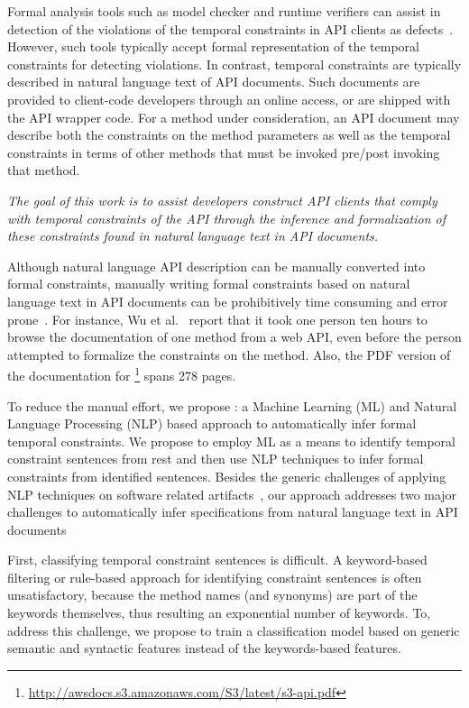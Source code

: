 Formal analysis tools such as model checker and runtime verifiers can assist in detection of the violations of the temporal constraints in API clients as defects~\cite{lee2012towards}.
However, such tools typically accept formal representation of the temporal constraints for detecting violations.
In contrast, temporal constraints are typically described in natural language text of API documents.
Such documents are provided to client-code developers through an online access, or are shipped with the API wrapper code.
For a method under consideration, an API document may describe both the constraints on the method parameters
as well as the temporal constraints in terms of other methods that must be invoked pre/post invoking that method.

\textit{The goal of this work is to assist developers construct API clients that comply with
	temporal constraints of the API through the inference and formalization of these constraints found in natural language text in API documents.}

Although natural language API description can be manually converted into formal constraints,
manually writing formal constraints based on natural language text in API documents can be prohibitively time consuming and error prone~\cite{wu2013inferring,RubingerWEB10}. 
For instance, Wu et al.~\cite{wu2013inferring} report that it took one person ten hours to browse the documentation of one method from a web API, even before the person attempted to formalize the constraints on the method. Also, the PDF version of the documentation for \amazonAPI\footnote{{\small \url{http://awsdocs.s3.amazonaws.com/S3/latest/s3-api.pdf}}} spans 278 pages.


To reduce the manual effort, we propose \tool: a Machine Learning (ML) and Natural Language Processing (NLP) based approach
to automatically infer formal temporal constraints. 
We propose to employ ML as a means to identify temporal constraint sentences from rest and then use NLP techniques to infer formal constraints from identified sentences. 
Besides the generic challenges of applying NLP techniques on software related artifacts~\cite{pandita12:inferring},
our approach addresses two major challenges to automatically infer specifications from natural language text in API documents 

First, classifying temporal constraint sentences is difficult. A keyword-based filtering or rule-based approach for identifying constraint sentences is often unsatisfactory, because the method names (and synonyms) are part of the keywords themselves, thus resulting an exponential number of keywords. To, address this challenge, we propose to train a classification model based on generic semantic and syntactic features instead of the keywords-based features.    

